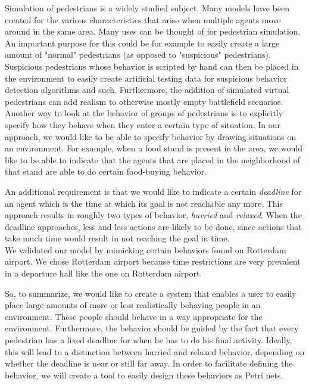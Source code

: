 \documentclass[11pt]{book}
\begin{document}
Simulation of pedestrians is a widely studied subject. Many models have been created for the various characteristics that arise when multiple agents move around in the same area. Many uses can be thought of for pedestrian simulation. An important purpose for this could be for example to easily create a large amount of "normal" pedestrians (as opposed to "suspicious" pedestrians).  Suspicious pedestrians whose behavior is scripted by hand can then be placed in the environment to easily create artificial testing data for suspicious behavior detection algorithms and such. Furthermore, the addition of simulated virtual pedestrians can add realism to otherwise mostly empty battlefield scenarios.\\
Another way to look at the behavior of groups of pedestrians is to explicitly specify how they behave when they enter a certain type of situation. In our approach, we would like to be able to specify behavior by drawing situations on an environment. For example, when a food stand is present in the area, we would like to be able to indicate that the agents that are placed in the neighborhood of that stand are able to do certain food-buying behavior.

An additional requirement is that we would like to indicate a certain \emph{deadline} for an agent which is the time at which its goal is not reachable any more. This approach results in roughly two types of behavior, \emph{hurried} and \emph{relaxed}. When the deadline approaches, less and less actions are likely to be done, since actions that take much time would result in not reaching the goal in time.\\
We validated our model by mimicking certain behaviors found on Rotterdam airport. We chose Rotterdam airport because time restrictions are very prevalent in a departure hall like the one on Rotterdam airport. 

So, to summarize, we would like to create a system that enables a user to easily place large amounts of more or less realistically behaving people in an environment. These people should behave in a way appropriate for the environment. Furthermore, the behavior should be guided by the fact that every pedestrian has a fixed deadline for when he has to do his final activity. Ideally, this will lead to a distinction between hurried and relaxed behavior, depending on whether the deadline is near or still far away. In order to facilitate defining the behavior, we will create a tool to easily design these behaviors as Petri nets. 
\end{document}
